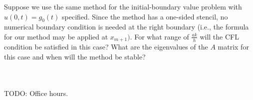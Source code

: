 Suppose we use the same method for the initial-boundary value problem with $u(0, t) = g_0(t)$ specified. Since the 
method has a one-sided stencil, no numerical boundary condition is needed at the right boundary (i.e., the formula for
our method may be applied at $x_{m+1})$. For what range of $\frac{ak}{h}$ will the CFL condition be satisfied in this
case? What are the eigenvalues of the $A$ matrix for this case and when will the method be stable?

\begin{solution}\ \\\\
    TODO: Office hours.
    \hfill\vfill
    \ \\
\end{solution}